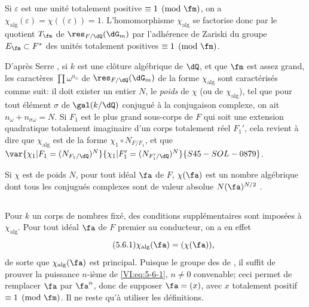 \subsection{}\label{VI:5-5}

Si $\varepsilon$ est une unité totalement positive $\equiv 1\pmod\fm$, on a 
$\chi_\text{alg}(\varepsilon) = \chi((\varepsilon)) = 1$. L'homomorphisme 
$\chi_\text{alg}$ se factorise donc par le quotient $T_\fm$ de 
$\res_{F/\dQ}(\dG_m)$ par l'adhérence de Zariski du groupe 
$E_\fm\subset F^\ast$ des unités totalement positives $\equiv 1\pmod\fm$. 

D'après Serre \cite[II.3]{se68}, si $k$ est une clôture algébrique de 
$\dQ$, et que $\fm$ est assez grand, les caractères $\prod \omega^{n_\omega}$ 
de $\res_{F/\dQ}(\dG_m)$ de la forme $\chi_\text{alg}$ sont caractérisés 
comme suit: il doit exister un entier $N$, le \emph{poids} de $\chi$ (ou de 
$\chi_\text{alg}$), tel que pour tout élément $\sigma$ de $\gal(k/\dQ)$ 
conjugué à la conjugaison complexe, on ait $n_\omega+n_{\sigma \omega}=N$. Si 
$F_1$ est le plus grand sous-corps de $F$ qui soit une extension quadratique 
totalement imaginaire d'un corps totalement réel $F_1'$, cela revient à 
dire que $\chi_\text{alg}$ est de la forme $\chi_1\circ N_{F/F_1}$, et que 
$\var{\chi_1|F_1=(N_{F_1/\dQ})^N}{\chi_1|F_1'=(N_{F_1'/\dQ})^N}{S45-SOL-0879}$. 

Si $\chi$ est de poids $N$, pour tout idéal $\fa$ de $F$, $\chi(\fa)$ est un 
nombre algébrique dont tous les conjugués complexes sont de valeur absolue 
$N(\fa)^{N/2}$ \cite[II.3 prop.2]{se68}. 





\subsection{}\label{VI:5-6}

Pour $k$ un corps de nombres fixé, des conditions supplémentaires sont 
imposées à $\chi_\text{alg}$. Pour tout idéal $\fa$ de $F$ premier au 
conducteur, on a en effet 
\begin{equation*}\tag{5.6.1}\label{VI:eq:5-6-1}
  \chi_\text{alg}(\fa) = (\chi(\fa)) \text{,} 
\end{equation*}
de sorte que $\chi_\text{alg}(\fa)$ est principal. Puisque le groupe des 
 de , il suffit de prouver la 
puissance $n$-ième de \eqref{VI:eq:5-6-1}, $n\ne 0$ convenable; ceci permet 
de remplacer $\fa$ par $\fa^n$, donc de supposer $\fa=(x)$, avec $x$ totalement 
positif $\equiv 1\pmod\fm$. Il ne reste qu'à utiliser les définitions. 

